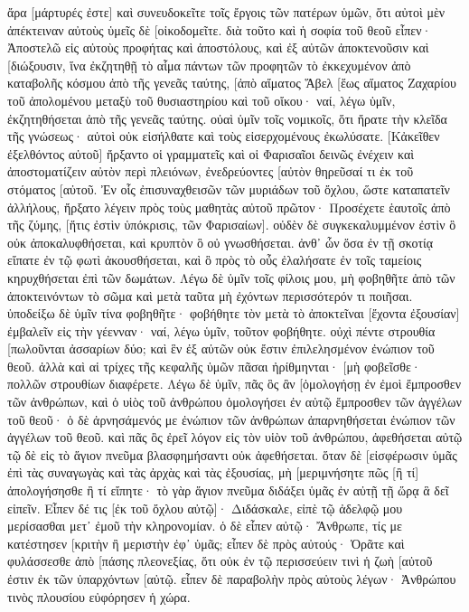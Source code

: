 ἄρα [μάρτυρές ἐστε] καὶ συνευδοκεῖτε τοῖς ἔργοις τῶν πατέρων ὑμῶν, ὅτι αὐτοὶ μὲν ἀπέκτειναν αὐτοὺς ὑμεῖς δὲ [οἰκοδομεῖτε. 
διὰ τοῦτο καὶ ἡ σοφία τοῦ θεοῦ εἶπεν· Ἀποστελῶ εἰς αὐτοὺς προφήτας καὶ ἀποστόλους, καὶ ἐξ αὐτῶν ἀποκτενοῦσιν καὶ [διώξουσιν, 
ἵνα ἐκζητηθῇ τὸ αἷμα πάντων τῶν προφητῶν τὸ ἐκκεχυμένον ἀπὸ καταβολῆς κόσμου ἀπὸ τῆς γενεᾶς ταύτης, 
[ἀπὸ αἵματος Ἅβελ [ἕως αἵματος Ζαχαρίου τοῦ ἀπολομένου μεταξὺ τοῦ θυσιαστηρίου καὶ τοῦ οἴκου· ναί, λέγω ὑμῖν, ἐκζητηθήσεται ἀπὸ τῆς γενεᾶς ταύτης. 
οὐαὶ ὑμῖν τοῖς νομικοῖς, ὅτι ἤρατε τὴν κλεῖδα τῆς γνώσεως· αὐτοὶ οὐκ εἰσήλθατε καὶ τοὺς εἰσερχομένους ἐκωλύσατε. 
[Κἀκεῖθεν ἐξελθόντος αὐτοῦ] ἤρξαντο οἱ γραμματεῖς καὶ οἱ Φαρισαῖοι δεινῶς ἐνέχειν καὶ ἀποστοματίζειν αὐτὸν περὶ πλειόνων, 
ἐνεδρεύοντες [αὐτὸν θηρεῦσαί τι ἐκ τοῦ στόματος [αὐτοῦ. 
Ἐν οἷς ἐπισυναχθεισῶν τῶν μυριάδων τοῦ ὄχλου, ὥστε καταπατεῖν ἀλλήλους, ἤρξατο λέγειν πρὸς τοὺς μαθητὰς αὐτοῦ πρῶτον· Προσέχετε ἑαυτοῖς ἀπὸ τῆς ζύμης, [ἥτις ἐστὶν ὑπόκρισις, τῶν Φαρισαίων]. 
οὐδὲν δὲ συγκεκαλυμμένον ἐστὶν ὃ οὐκ ἀποκαλυφθήσεται, καὶ κρυπτὸν ὃ οὐ γνωσθήσεται. 
ἀνθ᾽ ὧν ὅσα ἐν τῇ σκοτίᾳ εἴπατε ἐν τῷ φωτὶ ἀκουσθήσεται, καὶ ὃ πρὸς τὸ οὖς ἐλαλήσατε ἐν τοῖς ταμείοις κηρυχθήσεται ἐπὶ τῶν δωμάτων. 
Λέγω δὲ ὑμῖν τοῖς φίλοις μου, μὴ φοβηθῆτε ἀπὸ τῶν ἀποκτεινόντων τὸ σῶμα καὶ μετὰ ταῦτα μὴ ἐχόντων περισσότερόν τι ποιῆσαι. 
ὑποδείξω δὲ ὑμῖν τίνα φοβηθῆτε· φοβήθητε τὸν μετὰ τὸ ἀποκτεῖναι [ἔχοντα ἐξουσίαν] ἐμβαλεῖν εἰς τὴν γέενναν· ναί, λέγω ὑμῖν, τοῦτον φοβήθητε. 
οὐχὶ πέντε στρουθία [πωλοῦνται ἀσσαρίων δύο; καὶ ἓν ἐξ αὐτῶν οὐκ ἔστιν ἐπιλελησμένον ἐνώπιον τοῦ θεοῦ. 
ἀλλὰ καὶ αἱ τρίχες τῆς κεφαλῆς ὑμῶν πᾶσαι ἠρίθμηνται· [μὴ φοβεῖσθε· πολλῶν στρουθίων διαφέρετε. 
Λέγω δὲ ὑμῖν, πᾶς ὃς ἂν [ὁμολογήσῃ ἐν ἐμοὶ ἔμπροσθεν τῶν ἀνθρώπων, καὶ ὁ υἱὸς τοῦ ἀνθρώπου ὁμολογήσει ἐν αὐτῷ ἔμπροσθεν τῶν ἀγγέλων τοῦ θεοῦ· 
ὁ δὲ ἀρνησάμενός με ἐνώπιον τῶν ἀνθρώπων ἀπαρνηθήσεται ἐνώπιον τῶν ἀγγέλων τοῦ θεοῦ. 
καὶ πᾶς ὃς ἐρεῖ λόγον εἰς τὸν υἱὸν τοῦ ἀνθρώπου, ἀφεθήσεται αὐτῷ τῷ δὲ εἰς τὸ ἅγιον πνεῦμα βλασφημήσαντι οὐκ ἀφεθήσεται. 
ὅταν δὲ [εἰσφέρωσιν ὑμᾶς ἐπὶ τὰς συναγωγὰς καὶ τὰς ἀρχὰς καὶ τὰς ἐξουσίας, μὴ [μεριμνήσητε πῶς [ἢ τί] ἀπολογήσησθε ἢ τί εἴπητε· 
τὸ γὰρ ἅγιον πνεῦμα διδάξει ὑμᾶς ἐν αὐτῇ τῇ ὥρᾳ ἃ δεῖ εἰπεῖν. 
Εἶπεν δέ τις [ἐκ τοῦ ὄχλου αὐτῷ]· Διδάσκαλε, εἰπὲ τῷ ἀδελφῷ μου μερίσασθαι μετ᾽ ἐμοῦ τὴν κληρονομίαν. 
ὁ δὲ εἶπεν αὐτῷ· Ἄνθρωπε, τίς με κατέστησεν [κριτὴν ἢ μεριστὴν ἐφ᾽ ὑμᾶς; 
εἶπεν δὲ πρὸς αὐτούς· Ὁρᾶτε καὶ φυλάσσεσθε ἀπὸ [πάσης πλεονεξίας, ὅτι οὐκ ἐν τῷ περισσεύειν τινὶ ἡ ζωὴ [αὐτοῦ ἐστιν ἐκ τῶν ὑπαρχόντων [αὐτῷ. 
εἶπεν δὲ παραβολὴν πρὸς αὐτοὺς λέγων· Ἀνθρώπου τινὸς πλουσίου εὐφόρησεν ἡ χώρα. 
